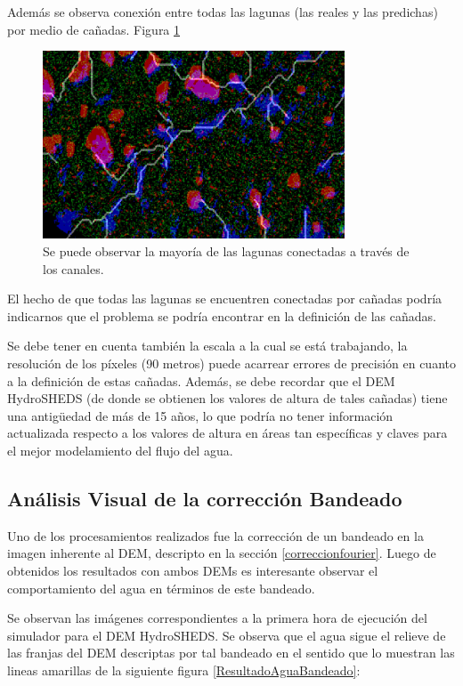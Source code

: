 \documentclass[10pt,a4paper, twoside]{report}
\begin{document}
Además se observa conexión entre todas las lagunas (las reales y las predichas) por medio de cañadas. Figura \ref{LagunaProblema2}

\begin{figure}[!htb]
   \centering      
   \includegraphics[width=0.8\textwidth]{imagenes/LagunaProblema2.jpg}
 \caption{Se puede observar la mayoría de las lagunas conectadas a través de los canales.}
 \label{LagunaProblema2}
\end{figure}

El hecho de que todas las lagunas se encuentren conectadas por cañadas podría indicarnos que el problema se podría encontrar en la definición de las cañadas.

Se debe tener en cuenta también la escala a la cual se está trabajando, la resolución de los píxeles (90 metros) puede acarrear errores de precisión en cuanto a la definición de estas cañadas. Además, se debe recordar que el DEM HydroSHEDS (de donde se obtienen los valores de altura de tales cañadas) tiene una antigüedad de más de 15 años, lo que podría no tener información actualizada respecto a los valores de altura en áreas tan específicas y claves para el mejor modelamiento del flujo del agua.


\subsection{Análisis Visual de la corrección Bandeado}

Uno de los procesamientos realizados fue la corrección de un bandeado en la imagen inherente al DEM, descripto en la sección \ref{correccionfourier}. Luego de obtenidos los resultados con ambos DEMs es interesante observar el comportamiento del agua en términos de este bandeado.

Se observan las imágenes correspondientes a la primera hora de ejecución del simulador para el DEM HydroSHEDS. Se observa que el agua sigue el relieve de las franjas del DEM descriptas por tal bandeado en el sentido que lo muestran las lineas amarillas de la siguiente figura \ref{ResultadoAguaBandeado}: 
\end{document}
